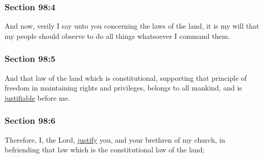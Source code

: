 	\subsubsection{Section 98:4} %
		\label{DC98-4}

		And now, verily I say unto you concerning the laws of the land, it is my will that my people should observe to do all things whatsoever I command them.


	\subsubsection{Section 98:5} %
		\label{DC98-5}

		And that law of the land which is constitutional, supporting that principle of freedom in maintaining rights and privileges, belongs to all mankind, and is \hyperref[JUSTIFICATION]{justifiable} before me.


	\subsubsection{Section 98:6} %
		\label{DC98-6}

		Therefore, I, the Lord, \hyperref[JUSTIFICATION]{justify} you, and your brethren of my church, in befriending that law which is the constitutional law of the land;



